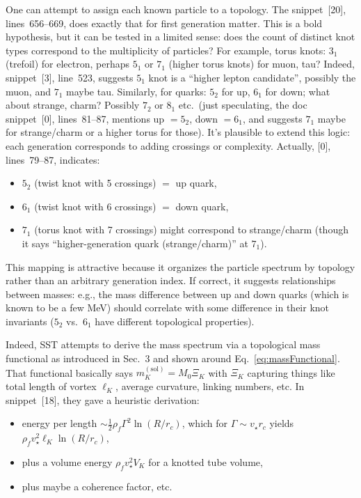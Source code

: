\documentclass[10pt,reprint,aps,onecolumn,nofootinbib]{revtex4-2}
\newcommand{\rc}{r_c}                                    %
\providecommand{\rc}{r_c}
\newcommand{\rhoF}{\rho_{\!f}}     %
\begin{document}
One can attempt to assign each known particle to a topology. The snippet~[20], lines~656--669, does exactly that for first generation matter. This is a bold hypothesis, but it can be tested in a limited sense: does the count of distinct knot types correspond to the multiplicity of particles? For example, torus knots: $3_1$ (trefoil) for electron, perhaps $5_1$ or $7_1$ (higher torus knots) for muon, tau? Indeed, snippet~[3], line~523, suggests $5_1$ knot is a ``higher lepton candidate'', possibly the muon, and $7_1$ maybe tau. Similarly, for quarks: $5_2$ for up, $6_1$ for down; what about strange, charm? Possibly $7_2$ or $8_1$ etc.\ (just speculating, the doc snippet~[0], lines~81--87, mentions up $= 5_2$, down $= 6_1$, and suggests $7_1$ maybe for strange/charm or a higher torus for those). It's plausible to extend this logic: each generation corresponds to adding crossings or complexity. Actually, [0], lines~79--87, indicates:

\begin{itemize}
  \item $5_2$ (twist knot with 5 crossings) $=$ up quark,
  \item $6_1$ (twist knot with 6 crossings) $=$ down quark,
  \item $7_1$ (torus knot with 7 crossings) might correspond to strange/charm (though it says ``higher-generation quark (strange/charm)'' at $7_1$).
\end{itemize}

This mapping is attractive because it organizes the particle spectrum by topology rather than an arbitrary generation index. If correct, it suggests relationships between masses: e.g., the mass difference between up and down quarks (which is known to be a few MeV) should correlate with some difference in their knot invariants ($5_2$ vs.\ $6_1$ have different topological properties).

Indeed, SST attempts to derive the mass spectrum via a topological mass functional as introduced in Sec.~3 and shown around Eq.~\eqref{eq:massFunctional}. That functional basically says $m_K^{(\text{sol})} = M_0 \Xi_K$ with $\Xi_K$ capturing things like total length of vortex $\ell_K$, average curvature, linking numbers, etc. In snippet~[18], they gave a heuristic derivation:

\begin{itemize}
  \item energy per length $\sim \frac{1}{2}\rhoF \Gamma^2 \ln(R/\rc)$, which for $\Gamma \sim v_\star \rc$ yields $\rhoF v_\star^2 \ell_K \ln(R/\rc)$,
  \item plus a volume energy $\rhoF v_\star^2 V_K$ for a knotted tube volume,
  \item plus maybe a coherence factor, etc.
\end{itemize}
\end{document}
